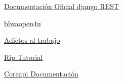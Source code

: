\documentclass[10pt]{article}
\begin{document}
\begin{thebibliography}{1}


\textcolor{B}{\href{https://www.django-rest-framework.org}{Documentación Oficial django REST}}


\textcolor{B}{\href{https://bbvaopen4u.com/es/actualidad/api-rest-que-es-y-cuales-son-sus-ventajas-en-el-desarrollo-de-proyectos}{bbvaopen4u}}


\textcolor{B}{\href{https://www.adictosaltrabajo.com}{Adictos al trabajo}}


\textcolor{B}{\href{https://riptutorial.com/es/django-rest-framework}{Rip Tutorial}}


\textcolor{B}{\href{https://www.coreapi.org}{Coreapi Documentación}}



\end{thebibliography}
\end{document}

